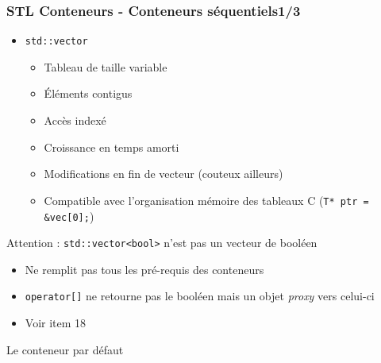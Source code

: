 \documentclass[C++.tex]{subfiles}
\begin{document}
\begin{frame}[fragile]
	\frametitle{STL Conteneurs - Conteneurs séquentiels\titlehfill{}1/3}
	\begin{itemize}
		\item \lstinline|std::vector|
		\begin{itemize}
			\item Tableau de taille variable
			\item Éléments contigus
			\item Accès indexé
			\item Croissance en temps amorti
			\item Modifications en fin de vecteur (couteux ailleurs)


			\item Compatible avec l'organisation mémoire des tableaux C (\lstinline|T* ptr = &vec[0];|)
		\end{itemize}
	\end{itemize}

	\begin{alertblock}{Attention : \lstinline|std::vector<bool>| n'est pas un vecteur de booléen}
		\begin{itemize}
			\item Ne remplit pas tous les pré-requis des conteneurs
			\item \lstinline|operator[]| ne retourne pas le booléen mais un objet \textit{proxy} vers celui-ci
			\item Voir \cite{effStl} item 18


		\end{itemize}
	\end{alertblock}

	\begin{exampleblock}{Le conteneur par défaut}
	\end{exampleblock}
\end{frame}
\end{document}
